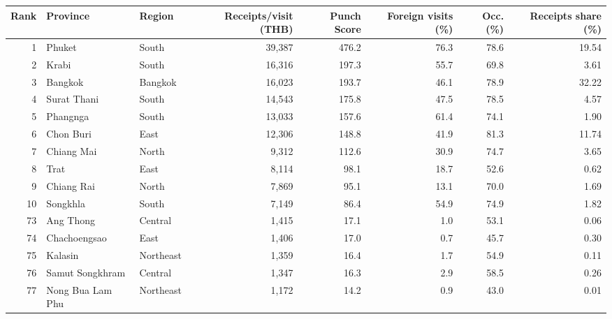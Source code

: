 \begin{tabular}{rllrrrrr}
\toprule
Rank & Province & Region & Receipts/visit (THB) & Punch Score & Foreign visits (\%) & Occ. (\%) & Receipts share (\%) \\
\midrule
1 & Phuket & South & 39,387 & 476.2 & 76.3 & 78.6 & 19.54 \\
2 & Krabi & South & 16,316 & 197.3 & 55.7 & 69.8 & 3.61 \\
3 & Bangkok & Bangkok & 16,023 & 193.7 & 46.1 & 78.9 & 32.22 \\
4 & Surat Thani & South & 14,543 & 175.8 & 47.5 & 78.5 & 4.57 \\
5 & Phangnga & South & 13,033 & 157.6 & 61.4 & 74.1 & 1.90 \\
6 & Chon Buri & East & 12,306 & 148.8 & 41.9 & 81.3 & 11.74 \\
7 & Chiang Mai & North & 9,312 & 112.6 & 30.9 & 74.7 & 3.65 \\
8 & Trat & East & 8,114 & 98.1 & 18.7 & 52.6 & 0.62 \\
9 & Chiang Rai & North & 7,869 & 95.1 & 13.1 & 70.0 & 1.69 \\
10 & Songkhla & South & 7,149 & 86.4 & 54.9 & 74.9 & 1.82 \\
73 & Ang Thong & Central & 1,415 & 17.1 & 1.0 & 53.1 & 0.06 \\
74 & Chachoengsao & East & 1,406 & 17.0 & 0.7 & 45.7 & 0.30 \\
75 & Kalasin & Northeast & 1,359 & 16.4 & 1.7 & 54.9 & 0.11 \\
76 & Samut Songkhram & Central & 1,347 & 16.3 & 2.9 & 58.5 & 0.26 \\
77 & Nong Bua Lam Phu & Northeast & 1,172 & 14.2 & 0.9 & 43.0 & 0.01 \\
\bottomrule
\end{tabular}
